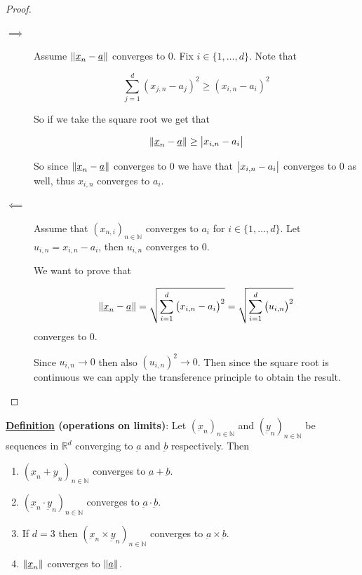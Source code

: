 \documentclass[10pt]{extarticle}
\newcommand{\R}{\mathbb{R}}
\newcommand{\N}{\mathbb{N}}
\newcommand{\munderbar}[1]{\underbar{\ensuremath{#1}}}
\newcommand{\skiplineafterproof}{$ $\par\nobreak\ignorespaces}
\begin{document}
\begin{proof}
    \skiplineafterproof
    \begin{description}
        \item[$\implies$]
            Assume $\norm{\munderbar{x}_n - \munderbar{a}}$ converges to 0.
            Fix $i \in \{1, \ldots, d\}$.
            Note that

            $$
                \sum_{j = 1}^d \left(x_{j, n} - a_j\right)^2 \geq \left(x_{i, n} - a_i\right)^2
            $$

            So if we take the square root we get that

            $$
                \norm{\munderbar{x}_n - \munderbar{a}} \geq \abs{x_{i, n} - a_i}
            $$

            So since $\norm{\munderbar{x}_n - \munderbar{a}}$ converges to 0 we have that $\abs{x_{i, n} - a_i}$ converges to 0 as well, thus $x_{i, n}$ converges to $a_i$.
        \item[$\impliedby$]
            Assume that $\left(x_{n, i}\right)_{n \in \N}$ converges to $a_i$ for $i \in \{1, \ldots, d\}$.
            Let $u_{i, n} = x_{i, n} - a_i$, then $u_{i, n}$ converges to 0.

            We want to prove that

            $$
                \norm{\munderbar{x}_n - \munderbar{a}} = \sqrt{\sum_{i=1}^d \left(x_{i, n} - a_i\right)^2} = \sqrt{\sum_{i=1}^d \left(u_{i, n}\right)^2}
            $$
            converges to 0.

            Since $u_{i, n} \to 0$ then also $\left(u_{i, n}\right)^2 \to 0$.
            Then since the square root is continuous we can apply the transference principle to obtain the result.
    \end{description}
\end{proof}

\textbf{\underline{Definition} (operations on limits)}:
Let $\left(\munderbar{x}_n\right)_{n \in \N}$ and $\left(\munderbar{y}_n\right)_{n \in \N}$ be sequences in $\R^d$ converging to $\munderbar{a}$ and $\munderbar{b}$ respectively.
Then

\begin{enumerate}

    \item $\left(\munderbar{x}_n + \munderbar{y}_n\right)_{n \in \N}$ converges to $\munderbar{a} + \munderbar{b}$.
    \item $\left(\munderbar{x}_n \cdot \munderbar{y}_n\right)_{n \in \N}$ converges to $\munderbar{a} \cdot \munderbar{b}$.
    \item If $d = 3$ then $\left(\munderbar{x}_n \times \munderbar{y}_n\right)_{n \in \N}$ converges to $\munderbar{a} \times \munderbar{b}$.
    \item $\norm{\munderbar{x}_n}$ converges to $\norm{\munderbar{a}}$.
\end{enumerate}
\end{document}
